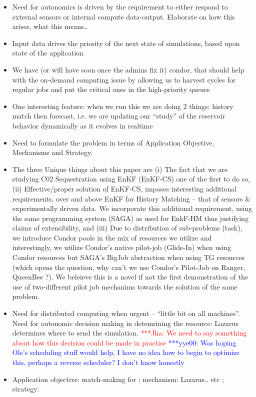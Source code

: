\documentclass[conference,final]{IEEEtran}
\newcommand{\jhanote}[1]{ {\textcolor{red} { ***Jha: #1 }}}
\newcommand{\yyenote}[1]{ {\textcolor{blue} { ***yye00: #1 }}}
\newcommand{\jhanote}[1]{}
\newcommand{\yyenote}[1]{}
\begin{document}
\begin{itemize}
\item Need for autonomics is driven by the requirement to either respond to external sensors or internal compute data-output. Elaborate on how this arises, what this means..  

\item Input data drives the priority of the next state of simulations, based upon state of the application

\item We have (or will have soon once the admins fix it) condor, that should help with the on-demand computing issue by allowing us to harvest cycles for regular jobs and put the critical ones in the high-priority queues
\item One interesting feature: when we run this we are doing 2 things: history match then forecast, i.e. we are updating our ``study'' of the reservoir behavior dynamically as it evolves in realtime

\item Need to formulate the problem in terms of Application Objective, Mechanisms and Strategy.

\item The three Unique things about this paper are (i) The fact that we are studying C02 Sequestration using EnKF (EnKF-CS) one of the first to do so, (ii) Effective/proper solution of EnKF-CS, imposes interesting additional requirements, over and above EnKF for History Matching -- that of sensors \& experimentally driven data. We incorporate this additional requirement, using the same programming system (SAGA) as used for EnkF-HM thus justifying claims of extensibility, and (iii) Due to distribution of sub-problems (task), we introduce Condor pools in the mix of resources we utilize and interestingly, we utilize Condor's native pilot-job (Glide-In) when using Condor resources but SAGA's BigJob abstraction when using TG resources (which opens the question, why can't we use Condor's Pilot-Job on Ranger, QueenBee ?). We beleieve this is a novel if not the first demonstration of the use of two-different pilot job mechanims towards the solution of the same problem.

\item Need for distributed computing when urgent -- ``little bit on all machines''. Need for autonomic decision making in detemrining the resource: Lazarus determines where to send the simulation. \jhanote{We need to say something about how this decision could be made in practise} \yyenote{Was hoping Ole's scheduling stuff would help, I have no idea how to begin to optimize this, perhaps a reverse scheduler? I don't know honestly}

\item Application objective: match-making for ; mechanism:  Lazarus.. etc ; strategy: 

\end{itemize}
\end{document}
